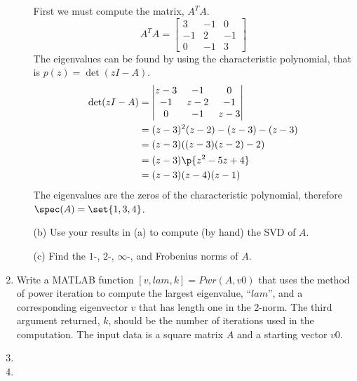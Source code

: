 \documentclass[11pt]{article}
\begin{document}
\begin{enumerate}
\begin{enumerate}
                First we must compute the matrix, $A^T A$.
                \[
                    A^T A =
                    \begin{bmatrix}
                        3 & -1 & 0 \\
                        -1 & 2 & -1 \\
                        0 & -1 & 3
                    \end{bmatrix}
                \]
                The eigenvalues can be found by using the characteristic
                polynomial, that is $p(z) = \det(zI - A)$.
                \begin{align*}
                    \det(zI - A) &=
                    \begin{vmatrix}
                        z - 3 &    -1 &     0 \\
                           -1 & z - 2 &    -1 \\
                            0 &    -1 & z - 3
                    \end{vmatrix} \\
                    &= (z - 3)^2(z - 2) - (z - 3) - (z - 3) \\
                    &= (z - 3)((z - 3)(z - 2) - 2) \\
                    &= (z - 3)\p{z^2 - 5z + 4} \\
                    &= (z - 3)(z - 4)(z - 1)
                \end{align*}
                The eigenvalues are the zeros of the characteristic polynomial,
                therefore $\spec(A) = \set{1, 3, 4}$.

            \item[(b)]
                Use your results in (a) to compute (by hand) the SVD of $A$.

            \item[(c)]
                Find the $1$-, $2$-, $\infty$-, and Frobenius norms of $A$.
        \end{enumerate}

    \item %
        Write a MATLAB function $[v, lam, k] = Pwr(A, v0)$ that uses the method
        of power iteration to compute the largest eigenvalue, ``$lam$'', and a
        corresponding eigenvector $v$ that has length one in the 2-norm.
        The third argument returned, $k$, should be the number of iterations used in
        the computation.
        The input data is a square matrix $A$ and a starting vector $v0$.

    \item %

    \item %

\end{enumerate}
\end{document}
